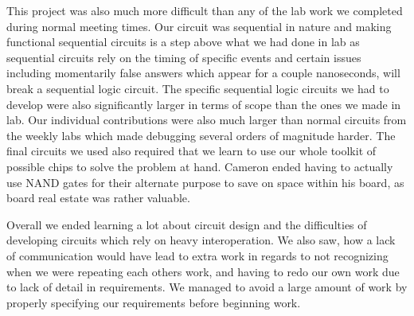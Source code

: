 This project was also much more difficult than any of the lab work we 
completed during normal meeting times. Our circuit was sequential in 
nature and making functional sequential circuits is a step above what we 
had done in lab as sequential circuits rely on the timing of specific 
events and certain issues including momentarily false answers which 
appear for a couple nanoseconds, will break a sequential logic circuit. 
The specific sequential logic circuits we had to develop were also 
significantly larger in terms of scope than the ones we made in lab. 
Our individual contributions were also much larger than normal circuits 
from the weekly labs which made debugging several orders of magnitude 
harder. The final circuits we used also required that we learn to use 
our whole toolkit of possible chips to solve the problem at hand. Cameron 
ended having to actually use NAND gates for their alternate purpose to
save on space within his board, as board real estate was rather valuable. 


Overall we ended learning a lot about circuit design and the difficulties 
of developing circuits which rely on heavy interoperation. We also saw, 
how a lack of communication would have lead to extra work in regards to 
not recognizing when we were repeating each others work, and having to 
redo our own work due to lack of detail in requirements. We managed to 
avoid a large amount of work by properly specifying our requirements 
before beginning work.

